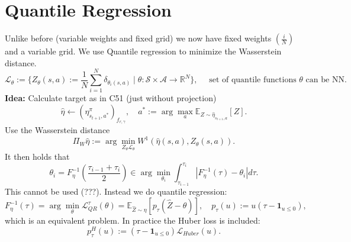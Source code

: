 \documentclass[../main.tex]{subfiles}  %
\begin{document}
\section{Quantile Regression}
Unlike before (variable weights and fixed grid) we now have fixed weights $(\frac{i}{N})$ and a variable grid. We use Quantile regression to minimize the Wasserstein distance.
\[
\mathcal{L}_\theta := \{ Z_\theta (s,a) := \frac{1}{N} \sum_{i=1}^N \delta_{\theta_i (s,a)}  \mid \theta : \mathcal{S} \times \mathcal{A} \to \mathbb{R}^N \}, \quad \text{ set of quantile functions $\theta$ can be NN.}
\] 
\textbf{Idea:} Calculate target as in C51 (just without projection)
\[
\hat{\eta} \leftarrow (\eta^\pi_{s_{t+1},a^*})_{f_{r,\gamma}}, \quad a^* := \arg \max_{a} \mathbb{E}_{Z \sim \hat{\eta}_{s_{t+1},a}} [Z].
\]
Use the Wasserstein distance 
\[
\Pi_W \hat{\eta} := \arg \min_{Z_\theta \mathcal{L}_\theta} W^1 (\hat{\eta}(s,a),Z_\theta (s,a)).
\]
It then holds that 
\[  
\theta_i = F_\eta^{-1} (\frac{\tau_{i-1}+\tau_i}{2}) \in \arg \min_{\theta_i} \int_{\tau_{i-1}}^{\tau_i} |F_\eta^{-1} (\tau) - \theta_i| d \tau.
\]
This cannot be used (???). Instead we do quantile regression: 
\[
F_\eta^{-1} (\tau) = \arg \min_\theta \mathcal{L}_{QR}^\tau (\theta) = \mathbb{E}_{\hat{Z} \sim \eta} [ p_\tau (\hat{Z}-\theta) ], \quad p_\tau (u) := u (\tau - \textbf{1}_{u \leq 0}),
\]
which is an equivalent problem. In practice the Huber loss is included: 
\[
p_\tau^H (u) := (\tau - \textbf{1}_{u\leq 0}) \mathcal{L}_{Huber} (u).
\] 
\end{document}
